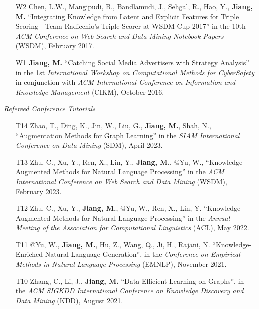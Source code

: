 \documentclass[10pt]{article}
\newenvironment{myindentpar}[1]%
{\begin{list}{}%
         {\setlength{\leftmargin}{#1}}%
         \item[]%
}
{\end{list}}
\newcounter{list}
\begin{document}
\begin{myindentpar}{0.00cm}
\begin{enumerate}[leftmargin=.5cm]
\item[W2] Chen, L.W., Mangipudi, B., Bandlamudi, J., Sehgal, R., Hao, Y., \textbf{Jiang, M.} ``Integrating Knowledge from Latent and Explicit Features for Triple Scoring—Team Radicchio's Triple Scorer at WSDM Cup 2017'' in the 10th \textit{ACM Conference on Web Search and Data Mining Notebook Papers} (WSDM), February 2017.

\item[W1] \textbf{Jiang, M.} ``Catching Social Media Advertisers with Strategy Analysis'' in the 1st \textit{International Workshop on Computational Methods for CyberSafety} in conjunction with \textit{ACM International Conference on Information and Knowledge Management} (CIKM), October 2016.

\end{enumerate}

\hspace{-0.25cm}\textit{Refereed Conference Tutorials}

\begin{enumerate}[leftmargin=.5cm]

\item[T14] Zhao, T., Ding, K., Jin, W., Liu, G., \textbf{Jiang, M.}, Shah, N., ``Augmentation Methods for Graph Learning'' in the \textit{SIAM International Conference on Data Mining} (SDM), April 2023.
		
\item[T13] Zhu, C., Xu, Y., Ren, X., Lin, Y., \textbf{Jiang, M.}, @Yu, W., ``Knowledge-Augmented Methods for Natural Language Processing'' in the \textit{ACM International Conference on Web Search and Data Mining} (WSDM), February 2023.

\item[T12] Zhu, C., Xu, Y., \textbf{Jiang, M.}, @Yu, W., Ren, X., Lin, Y. ``Knowledge-Augmented Methods for Natural Language Processing'' in the \textit{Annual Meeting of the Association for Computational Linguistics} (ACL), May 2022.

\item[T11] @Yu, W., \textbf{Jiang, M.}, Hu, Z., Wang, Q., Ji, H., Rajani, N. ``Knowledge-Enriched Natural Language Generation'', in the \textit{Conference on Empirical Methods in Natural Language Processing} (EMNLP), November 2021.

\item[T10] Zhang, C., Li, J., \textbf{Jiang, M.} ``Data Efficient Learning on Graphs'', in the \textit{ACM SIGKDD International Conference on Knowledge Discovery and Data Mining} (KDD), August 2021.
		

\end{enumerate}
\end{myindentpar}
\end{document}
